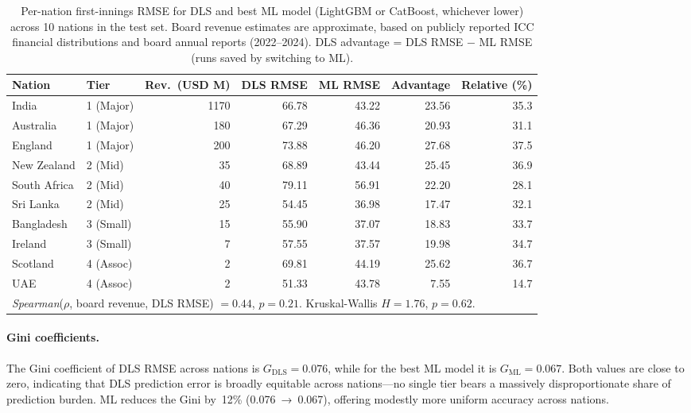 \documentclass[12pt,a4paper,oneside]{report}
\begin{document}
\begin{table}[htbp]
\centering
\caption[Per-team prediction RMSE by ICC economic tier]{Per-nation first-innings RMSE for DLS and best ML model (LightGBM or CatBoost, whichever lower) across 10 nations in the test set.  Board revenue estimates are approximate, based on publicly reported ICC financial distributions and board annual reports (2022--2024).  DLS advantage = DLS RMSE $-$ ML RMSE (runs saved by switching to ML).}
\label{tab:econ_fairness}
\small
\begin{tabular}{llrrrrr}
\toprule
\textbf{Nation} & \textbf{Tier} & \textbf{Rev.\ (USD M)} & \textbf{DLS RMSE} & \textbf{ML RMSE} & \textbf{Advantage} & \textbf{Relative (\%)} \\
\midrule
India        & 1 (Major) & 1170 & 66.78 & 43.22 & 23.56 & 35.3 \\
Australia    & 1 (Major) &  180 & 67.29 & 46.36 & 20.93 & 31.1 \\
England      & 1 (Major) &  200 & 73.88 & 46.20 & 27.68 & 37.5 \\
\midrule
New Zealand  & 2 (Mid)   &   35 & 68.89 & 43.44 & 25.45 & 36.9 \\
South Africa & 2 (Mid)   &   40 & 79.11 & 56.91 & 22.20 & 28.1 \\
Sri Lanka    & 2 (Mid)   &   25 & 54.45 & 36.98 & 17.47 & 32.1 \\
\midrule
Bangladesh   & 3 (Small) &   15 & 55.90 & 37.07 & 18.83 & 33.7 \\
Ireland      & 3 (Small) &    7 & 57.55 & 37.57 & 19.98 & 34.7 \\
\midrule
Scotland     & 4 (Assoc) &    2 & 69.81 & 44.19 & 25.62 & 36.7 \\
UAE          & 4 (Assoc) &    2 & 51.33 & 43.78 &  7.55 & 14.7 \\
\bottomrule
\multicolumn{7}{l}{\small \textit{Spearman}($\rho$, board revenue, DLS RMSE) $= 0.44$, $p=0.21$.  Kruskal-Wallis $H=1.76$, $p=0.62$.} \\
\end{tabular}
\end{table}

\paragraph{Gini coefficients.}  The Gini coefficient of DLS RMSE across nations is $G_\text{DLS} = 0.076$, while for the best ML model it is $G_\text{ML} = 0.067$.  Both values are close to zero, indicating that DLS prediction error is broadly equitable across nations---no single tier bears a massively disproportionate share of prediction burden.  ML reduces the Gini by~12\% (0.076~→~0.067), offering modestly more uniform accuracy across nations.
\end{document}

